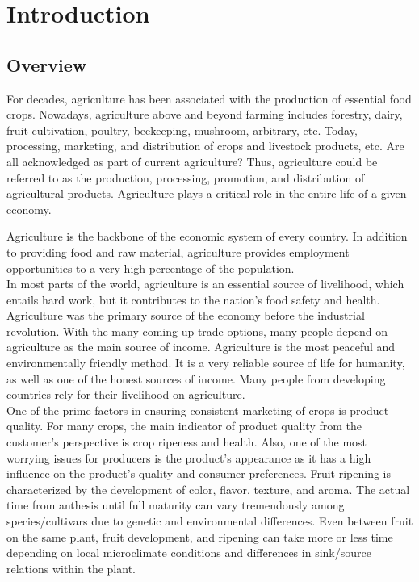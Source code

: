 \chapter{Introduction}

\section{Overview}

For decades, agriculture has been associated with the production of essential 
food crops. Nowadays, agriculture above and beyond farming includes forestry, 
dairy, fruit cultivation, poultry, beekeeping, mushroom, arbitrary, etc. Today, 
processing, marketing, and distribution of crops and livestock products, etc. 
Are all acknowledged as part of current agriculture? Thus, agriculture could 
be referred to as the production, processing, promotion, and distribution of 
agricultural products. Agriculture plays a critical role in the entire life 
of a given economy.

Agriculture is the backbone of the economic system of every country. 
In addition to providing food and raw material, agriculture provides 
employment opportunities to a very high percentage of the population. \\

In most parts of the world, agriculture is an essential source of livelihood,
which entails hard work, but it contributes to the nation's food safety and 
health. Agriculture was the primary source of the economy before the industrial 
revolution. With the many coming up trade options, many people depend on agriculture 
as the main source of income. Agriculture is the most peaceful and environmentally 
friendly method. It is a very reliable source of life for humanity, as well as 
one of the honest sources of income. Many people from developing countries rely 
for their livelihood on agriculture. \\

One of the prime factors in ensuring consistent marketing of crops is product quality. 
For many crops, the main indicator of product quality from the customer's perspective 
is crop ripeness and health. Also, one of the most worrying issues for producers is 
the product's appearance as it has a high influence on the product's quality and consumer 
preferences. Fruit ripening is characterized by the development of color, flavor, texture, 
and aroma. The actual time from anthesis until full maturity can vary tremendously among 
species/cultivars due to genetic and environmental differences. Even between fruit on the 
same plant, fruit development, and ripening can take more or less time depending on local 
microclimate conditions and differences in sink/source relations within the plant. \\


